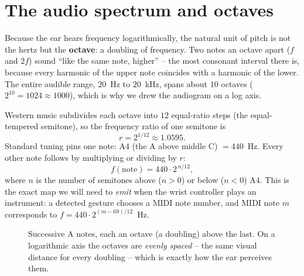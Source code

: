\section{The audio spectrum and octaves}
\label{ch26:octaves}

Because the ear hears frequency logarithmically, the natural unit of pitch is not the hertz but
the \textbf{octave}: a doubling of frequency. Two notes an octave apart ($f$ and $2f$) sound
``like the same note, higher'' -- the most consonant interval there is, because every harmonic of
the upper note coincides with a harmonic of the lower. The entire audible range, $20$~Hz to
$20$~kHz, spans about $10$ octaves ($2^{10} = 1024 \approx 1000$), which is why we drew the
audiogram on a log axis.

Western music subdivides each octave into $12$ equal-ratio steps (the equal-tempered semitone),
so the frequency ratio of one semitone is
\[
  r = 2^{1/12} \approx 1.0595.
\]
Standard tuning pins one note: A4 (the A above middle C) $= 440$~Hz. Every other note follows by
multiplying or dividing by $r$:
\[
  f(\text{note}) = 440 \cdot 2^{\,n/12},
\]
where $n$ is the number of semitones above ($n>0$) or below ($n<0$) A4. This is the exact map we
will need to \emph{emit} when the wrist controller plays an instrument: a detected gesture chooses
a MIDI note number, and MIDI note $m$ corresponds to $f = 440 \cdot 2^{(m-69)/12}$~Hz.

\begin{figure}[H]
\centering
{}
\caption{Successive A notes, each an octave (a doubling) above the last. On a logarithmic axis the
octaves are \emph{evenly spaced} -- the same visual distance for every doubling -- which is exactly
how the ear perceives them.}
\label{ch26:fig-octaves}
\end{figure}

